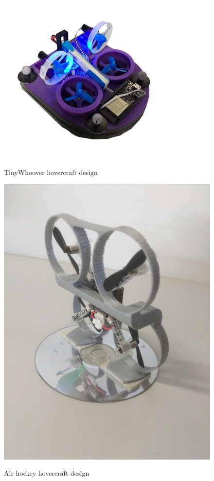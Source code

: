 \documentclass[12pt,titlepage]{article}
\begin{document}
\begin{figure}[H]
    \centering
\begin{minipage}{.5\textwidth}
  \centering
    \includegraphics[width=0.95\columnwidth]{Images/previous_hov_1.PNG}\\
    \caption{TinyWhoover hovercraft design \cite{b2}}
    \label{fig:prev_hard_1}
    \end{minipage}%
\begin{minipage}{.5\textwidth}
  \centering
    \includegraphics[width=0.74\columnwidth]{Images/airhockey.jpg}\\
    \caption{Air hockey hovercraft design}
    \label{fig:prev_hard_2}
    \end{minipage}%
\end{figure}
\end{document}
